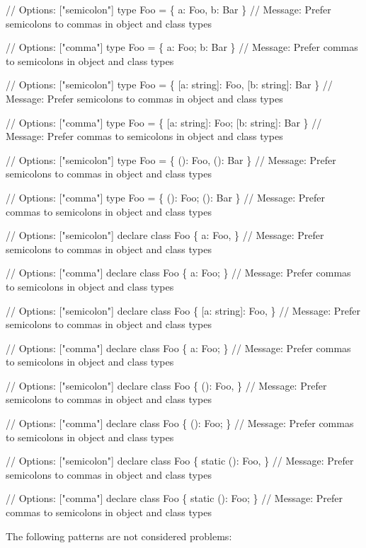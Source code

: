 \begin{DoxyCode}
// Options: ["semicolon"]
type Foo = \{ a: Foo, b: Bar \}
// Message: Prefer semicolons to commas in object and class types

// Options: ["comma"]
type Foo = \{ a: Foo; b: Bar \}
// Message: Prefer commas to semicolons in object and class types

// Options: ["semicolon"]
type Foo = \{ [a: string]: Foo, [b: string]: Bar \}
// Message: Prefer semicolons to commas in object and class types

// Options: ["comma"]
type Foo = \{ [a: string]: Foo; [b: string]: Bar \}
// Message: Prefer commas to semicolons in object and class types

// Options: ["semicolon"]
type Foo = \{ (): Foo, (): Bar \}
// Message: Prefer semicolons to commas in object and class types

// Options: ["comma"]
type Foo = \{ (): Foo; (): Bar \}
// Message: Prefer commas to semicolons in object and class types

// Options: ["semicolon"]
declare class Foo \{ a: Foo, \}
// Message: Prefer semicolons to commas in object and class types

// Options: ["comma"]
declare class Foo \{ a: Foo; \}
// Message: Prefer commas to semicolons in object and class types

// Options: ["semicolon"]
declare class Foo \{ [a: string]: Foo, \}
// Message: Prefer semicolons to commas in object and class types

// Options: ["comma"]
declare class Foo \{ a: Foo; \}
// Message: Prefer commas to semicolons in object and class types

// Options: ["semicolon"]
declare class Foo \{ (): Foo, \}
// Message: Prefer semicolons to commas in object and class types

// Options: ["comma"]
declare class Foo \{ (): Foo; \}
// Message: Prefer commas to semicolons in object and class types

// Options: ["semicolon"]
declare class Foo \{ static (): Foo, \}
// Message: Prefer semicolons to commas in object and class types

// Options: ["comma"]
declare class Foo \{ static (): Foo; \}
// Message: Prefer commas to semicolons in object and class types
\end{DoxyCode}


The following patterns are not considered problems\+:


